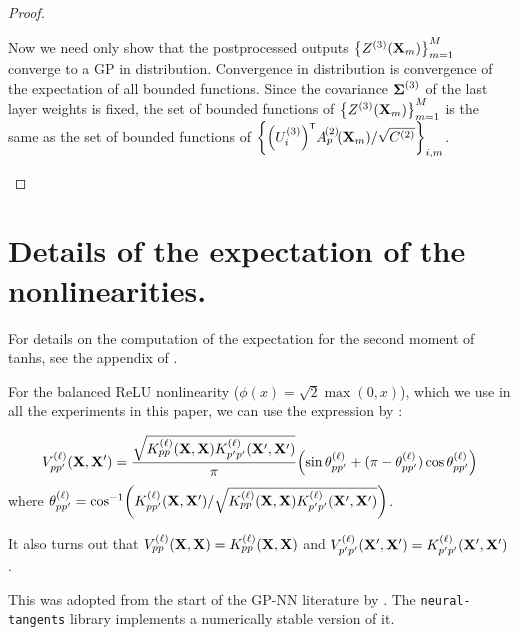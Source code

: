 {{\begin{proof}
\begin{itemize}
      Now we need only show that the postprocessed outputs $\cb{Z^{(3)}(\vX_m)}_{m=1}^M$
      converge to a GP in distribution. Convergence in distribution is
      convergence of the expectation of all bounded functions. Since the
      covariance $\boldsymbol{\Sigma}^{(3)}$ of the last layer weights is fixed, the set of
      bounded functions of $\cb{Z^{(3)}(\vX_m)}_{m=1}^M$ is the same as the set
      of bounded functions of $\cb{\bra{\layerUs{3}_i}^\tp \layerNLAsm{2}{\patch}{\vX_m}/\sqrt{\layerC{2}}}_{i,m}$.
\end{itemize}

\end{proof}

} %
}%

\section{Details of the expectation of the nonlinearities.}
For details on the computation of the expectation for the second moment of 
tanhs, see the appendix of \citep{lee2018dnnlimit}.

For the balanced ReLU nonlinearity ($\phi(x) = \sqrt{2}\max(0, x)$), which we
use in all the experiments in this paper, we can use the expression by \citet{cho2009mkm}:
{
\begin{equation}
  V_{pp'}\ssup{\ell}(\vX, \vX') = \frac{\sqrt{K_{pp}\ssup{\ell}(\vX,\vX)K_{p'p'}\ssup{\ell}(\vX',\vX')}}{\pi} \bra{\sin \theta_{pp'}\ssup{\ell} + (\pi - \theta_{pp'}\ssup{\ell}) \cos \theta_{pp'}\ssup{\ell}}
  \label{eq:nlin-relu}
\end{equation}
where $\theta_{pp'}\ssup{\ell} = \cos^{-1}\left( K_{pp'}\ssup{\ell}(\vX,\vX') /
  \sqrt{K_{pp}\ssup{\ell}(\vX,\vX)K_{p'p'}\ssup{\ell}(\vX',\vX')}\right)$.

It also turns out that $V_{pp}\ssup{\ell}(\vX, \vX) = K_{pp}\ssup{\ell}(\vX,
\vX)$ and $V_{p'p'}\ssup{\ell}(\vX', \vX') = K_{p'p'}\ssup{\ell}(\vX', \vX')$.
}

This was adopted from the start of the GP-NN literature by
\citet{lee2018dnnlimit,matthews2018dnnlimit}. The 
\texttt{neural-tangents} library \citep{neuraltangents2020} implements a
numerically stable version of it.

